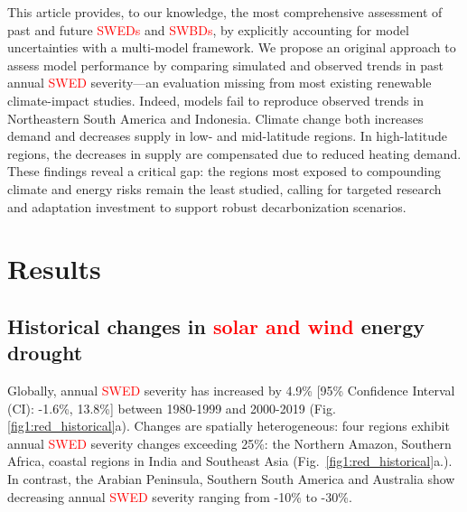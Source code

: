 \documentclass[pdflatex,sn-mathphys-num]{sn-jnl}%
\begin{document}
This article provides, to our knowledge, the most comprehensive assessment of past and future \textcolor{red}{SWEDs} and \textcolor{red}{SWBDs}, by explicitly accounting for model uncertainties with a multi-model framework. We propose an original approach to assess model performance by comparing simulated and observed trends in past annual \textcolor{red}{SWED} severity—an evaluation missing from most existing renewable climate-impact studies. Indeed, models fail to reproduce observed trends in Northeastern South America and Indonesia. Climate change both increases demand and decreases supply in low- and mid-latitude regions. In high-latitude regions, the decreases in supply are compensated due to reduced heating demand. These findings reveal a critical gap: the regions most exposed to compounding climate and energy risks remain the least studied, calling for targeted research and adaptation investment to support robust decarbonization scenarios.




\section{Results}\label{sec:results}


\subsection{Historical changes in \textcolor{red}{solar and wind} energy drought}\label{sec:historical}

Globally, annual \textcolor{red}{SWED} severity has increased by 4.9\% [95\% Confidence Interval (CI): -1.6\%, 13.8\%] between 1980-1999 and 2000-2019 (Fig. \ref{fig1:red_historical}a). Changes are spatially heterogeneous: four regions exhibit annual \textcolor{red}{SWED} severity changes exceeding 25\%: the Northern Amazon, Southern Africa, coastal regions in India and Southeast Asia (Fig.~\ref{fig1:red_historical}a.). In contrast, the Arabian Peninsula, Southern South America and Australia show decreasing annual \textcolor{red}{SWED} severity ranging from -10\% to -30\%.
\end{document}

